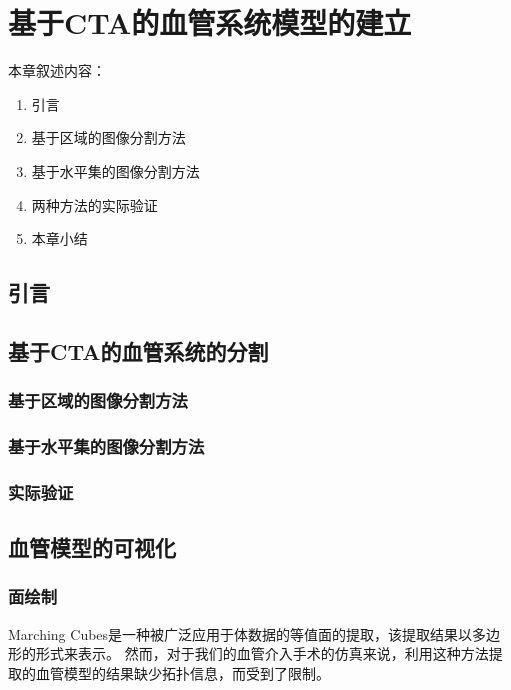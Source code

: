 \chapter{基于CTA的血管系统模型的建立}
\label{chap3} \fontsize{12pt}{12pt}\selectfont

本章叙述内容：
\begin{enumerate}
  \item 引言
  \item 基于区域的图像分割方法
  \item 基于水平集的图像分割方法
  \item 两种方法的实际验证
  \item 本章小结
\end{enumerate}

\section{引言}

\section{基于CTA的血管系统的分割}

\subsection{基于区域的图像分割方法}

\subsection{基于水平集的图像分割方法}

\subsection{实际验证}

\section{血管模型的可视化}

\subsection{面绘制}

Marching Cubes\cite{Lorensen1987MC}是一种被广泛应用于体数据的等值面的提取，该提取结果以多边形的形式来表示。
然而，对于我们的血管介入手术的仿真来说，利用这种方法提取的血管模型的结果缺少拓扑信息，而受到了限制\cite{Nowinski2001NeuroCath}\cite{Hahn1998GWU}。

